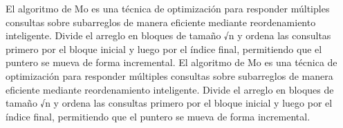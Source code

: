 \markdownRendererDocumentBegin
\markdownRendererSectionBegin
{}\markdownRendererInterblockSeparator
{}El algoritmo de Mo es una técnica de optimización para responder múltiples consultas sobre subarreglos de manera eficiente mediante reordenamiento inteligente. Divide el arreglo en bloques de tamaño √n y ordena las consultas primero por el bloque inicial y luego por el índice final, permitiendo que el puntero se mueva de forma incremental.\markdownRendererInterblockSeparator
{}
\markdownRendererSectionEnd \markdownRendererDocumentEnd\markdownRendererDocumentBegin
\markdownRendererSectionBegin
{}\markdownRendererInterblockSeparator
{}El algoritmo de Mo es una técnica de optimización para responder múltiples consultas sobre subarreglos de manera eficiente mediante reordenamiento inteligente. Divide el arreglo en bloques de tamaño √n y ordena las consultas primero por el bloque inicial y luego por el índice final, permitiendo que el puntero se mueva de forma incremental.\markdownRendererInterblockSeparator
{}
\markdownRendererSectionEnd \markdownRendererDocumentEnd
